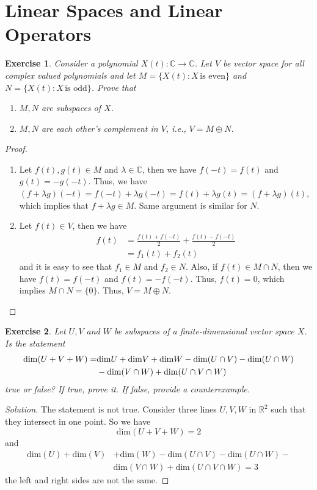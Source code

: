\documentclass[11pt]{book}
\newtheorem{exercise}{Exercise}[section]
\theoremstyle{definition}
\numberwithin{equation}{chapter}
\begin{document}
\section{Linear Spaces and Linear Operators}
\begin{exercise}\label{ex_1}
Consider a polynomial $X(t):\mathbb{C}\to\mathbb{C}$. Let $V$ be vector space for all complex valued polynomials and let $M = \{X(t): X \,\text{is even}\}$ and $N = \{X(t): X \,\text{is odd}\}$. Prove that 
\begin{enumerate}[label=(\alph*)]
    \item $M,N$ are subspaces of $X$.
    \item $M, N$ are each other's complement in $V$, i.e., $V = M\oplus N$.
\end{enumerate}
\end{exercise}
\begin{proof}
~\begin{enumerate}[label=(\alph*)]
    \item Let $f(t), g(t)\in M$ and $\lambda\in\mathbb{C}$, then we have $f(-t) = f(t)$ and $g(t) = -g(-t)$. Thus, we have $(f+\lambda g)(-t) = f(-t) + \lambda g(-t) = f(t) + \lambda g(t) = (f+\lambda g)(t)$, which implies that $f+\lambda g\in M$. Same argument is similar for $N$.
    \item Let $f(t)\in V$, then we have 
    \begin{align*}
        f(t) & = \frac{f(t) + f(-t)}{2} + \frac{f(t) - f(-t)}{2} \\
        & = f_1(t) + f_2(t)
    \end{align*}
    and it is easy to see that $f_1\in M$ and $f_2\in N$. Also, if $f(t)\in M\cap N$, then we have $f(t) = f(-t)$ and $f(t) = -f(-t)$. Thus, $f(t) = 0$, which implies $M\cap N = \{0\}$. Thus, $V = M\oplus N$.
\end{enumerate}
\end{proof}

\medskip

\begin{exercise}\label{ex_2}
Let $U, V$ and $W$ be subspaces of a finite-dimensional vector space $X$. Is the statement
\begin{align*}
    {\rm dim}(U + V + W) = & {\rm dim} U + {\rm dim} V + {\rm dim} W - {\rm dim}(U \cap V) - {\rm dim}(U \cap W) \\
    & - {\rm dim}(V \cap W) + {\rm dim}(U \cap V \cap W)
\end{align*}
true or false? If true, prove it. If false, provide a counterexample.
\end{exercise}
\begin{proof}[Solution]
The statement is not true. Consider three lines $U,V,W$ in $\mathbb{R}^2$ such that they intersect in one point. So we have
$$\text{dim} (U+V+W) = 2$$
and
\begin{align*}
   \text{dim}(U) + \text{dim}(V) & + \text{dim}(W) - \text{dim}(U \cap V) - \text{dim}(U \cap W) - \\
   & \text{dim}(V \cap W) + \text{dim}(U \cap V \cap W) = 3
\end{align*}
the left and right sides are not the same. 
\end{proof}
\end{document}
